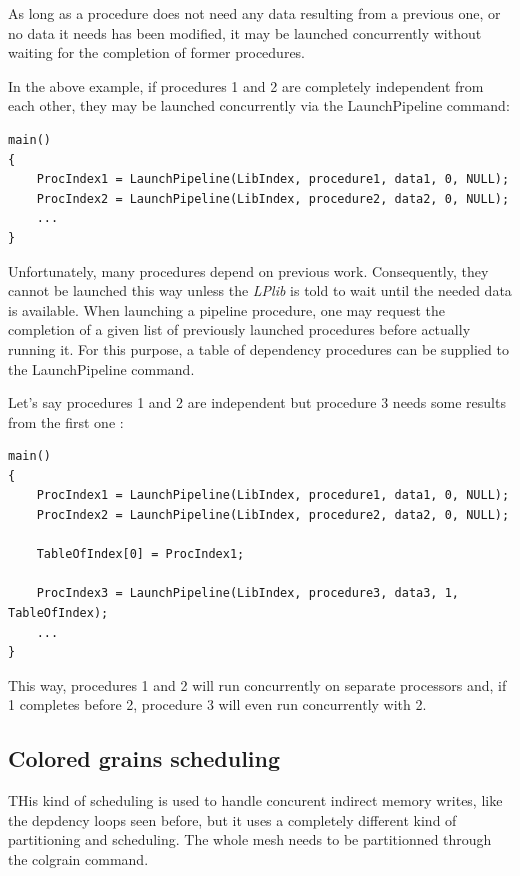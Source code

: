 \documentclass[a4paper,12pt]{article}
\begin{document}
As long as a procedure does not need any data resulting from a previous one, or no data it needs has been modified, it may be launched concurrently without waiting for the completion of former procedures.

In the above example, if procedures 1 and 2 are completely independent from each other, they may be launched concurrently via the LaunchPipeline command:

\begin{tt}
\begin{verbatim}
main()
{
    ProcIndex1 = LaunchPipeline(LibIndex, procedure1, data1, 0, NULL);
    ProcIndex2 = LaunchPipeline(LibIndex, procedure2, data2, 0, NULL);
    ...
}
\end{verbatim}
\end{tt}
\normalfont

Unfortunately, many procedures depend on previous work. Consequently, they cannot be launched this way unless the \emph{LPlib} is told to wait until the needed data is available. When launching a pipeline procedure, one may request the completion of a given list of previously launched procedures before actually running it. For this purpose, a table of dependency procedures can be supplied to the LaunchPipeline command.

Let's say procedures 1 and 2 are independent but procedure 3 needs some results from the first one :

\begin{tt}
\begin{verbatim}
main()
{
    ProcIndex1 = LaunchPipeline(LibIndex, procedure1, data1, 0, NULL);
    ProcIndex2 = LaunchPipeline(LibIndex, procedure2, data2, 0, NULL);

    TableOfIndex[0] = ProcIndex1;

    ProcIndex3 = LaunchPipeline(LibIndex, procedure3, data3, 1, TableOfIndex);
    ...
}
\end{verbatim}
\end{tt}
\normalfont

This way, procedures 1 and 2 will run concurrently on separate processors and, if 1 completes before 2, procedure 3 will even run concurrently with 2.


\subsection{Colored grains scheduling}

THis kind of scheduling is used to handle concurent indirect memory writes, like the depdency loops seen before, but it uses a completely different kind of partitioning and scheduling. The whole mesh needs to be partitionned through the colgrain command.
\end{document}
